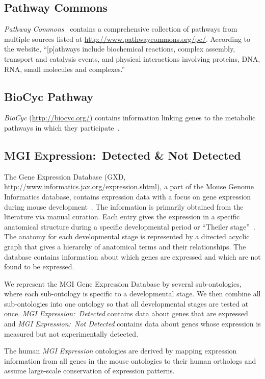 \subsection{Pathway Commons}
\emph{Pathway Commons}~\citep{Cerami2006} contains a comprehensive collection of pathways from multiple sources listed at 
\url{http://www.pathwaycommons.org/pc/}.  According to the website, ``[p]athways include biochemical reactions, complex
assembly, transport and catalysis events, and physical interactions involving proteins, DNA, RNA, small molecules and
complexes.''

\subsection{BioCyc Pathway}
\emph{BioCyc} (\url{http://biocyc.org/}) contains information linking genes to the metabolic pathways in which they
participate~\citep{Caspi2008}.

\subsection{MGI Expression:\ Detected \& Not Detected}
The Gene Expression Database (GXD,
\url{http://www.informatics.jax.org/expression.shtml}), a part of the Mouse
Genome Informatics database, contains expression data with a focus on gene
expression during mouse development~\citep{Smith2007,Bult2008}.  The
information is primarily obtained from the literature via manual
curation. Each entry gives the expression in a specific anatomical structure
during a specific developmental period or ``Theiler
stage''~\citep{Theiler1989}.  The anatomy for each developmental stage is
represented by a directed acyclic graph that gives a hierarchy of anatomical
terms and their relationships. The database contains information about which
genes are expressed and which are not found to be expressed.

We represent the MGI Gene Expression Database by several sub-ontologies,
where each sub-ontology is specific to a developmental stage. We then combine
all sub-ontologies into one ontology so that all developmental stages are
tested at once.  \emph{MGI Expression:\ Detected} contains data about genes
that are expressed and \emph{MGI Expression:\ Not Detected} contains data
about genes whose expression is measured but not experimentally detected.

The human \emph{MGI Expression} ontologies are derived by mapping expression
information from all genes in the mouse ontologies to their human orthologs
and assume large-scale conservation of expression patterns.

